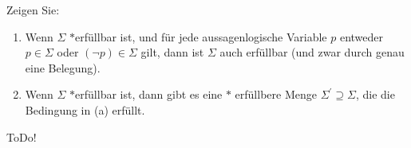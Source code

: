 
\begin{exercise}[27]

Zeigen Sie:

\begin{enumerate}
    \item Wenn $\Sigma$ $\ast$erfüllbar ist, und für jede aussagenlogische Variable $p$ entweder $p \in \Sigma$ oder $(\neg p) \in \Sigma$ gilt, dann ist $\Sigma$ auch erfüllbar (und zwar durch genau eine Belegung).
    \item Wenn $\Sigma$ $\ast$erfüllbar ist, dann gibt es eine $\ast$ erfüllbere Menge $\Sigma^\prime \supseteq \Sigma$, die die Bedingung in (a) erfüllt.
\end{enumerate}

\end{exercise}


\begin{solution}

ToDo!

\end{solution}

